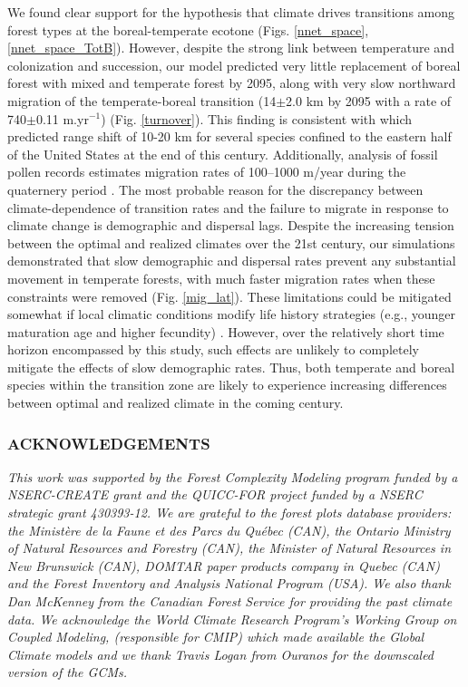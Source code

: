 We found clear support for the hypothesis that climate drives transitions among forest types at the
boreal-temperate ecotone (Figs. \ref{nnet_space}, \ref{nnet_space_TotB}).  However, despite the
strong link between temperature and colonization and succession, our model predicted very little
replacement of boreal forest with mixed and temperate forest by 2095, along with very slow northward
migration of the temperate-boreal transition (14$\pm$2.0 km by 2095 with a rate of 740$\pm$0.11
m.yr$^{-1}$) (Fig. \ref{turnover}). This finding is consistent with \citet{Iverson2004} which
predicted range shift of 10-20 km for several species confined to the eastern half of the United
States at the end of this century.  Additionally, analysis of fossil pollen records estimates
migration rates of 100--1000 m/year during the quaternery period
\citep{Davis1981,MacDonald1986,McLachlan2005}. The most probable reason for the discrepancy between
climate-dependence of transition rates and the failure to migrate in response to climate change is
demographic and dispersal lags. Despite the increasing tension between the optimal and realized
climates over the 21st century, our simulations demonstrated that slow demographic and dispersal
rates prevent any substantial movement in temperate forests, with much faster migration rates when
these constraints were removed (Fig. \ref{mig_lat}). These limitations could be mitigated somewhat
if local climatic conditions modify life history strategies (e.g., younger maturation age and higher
fecundity) \citep{Snell2014a}.  However, over the relatively short time horizon encompassed by this
study, such effects are unlikely to completely mitigate the effects of slow demographic rates. Thus,
both temperate and boreal species within the transition zone are likely to experience increasing
differences between optimal and realized climate in the coming century.

\subsubsection*{\uppercase{Acknowledgements}}
\textit{This work was supported by the Forest Complexity Modeling program
funded by a NSERC-CREATE grant and the QUICC-FOR project funded by a NSERC
strategic grant 430393-12. We are grateful to the forest plots database providers: the
Ministère de la Faune et des Parcs du Québec (CAN), the Ontario Ministry of
Natural Resources and Forestry (CAN), the Minister of Natural Resources in New
Brunswick (CAN), DOMTAR paper products company in Quebec (CAN) and the Forest
Inventory and Analysis National Program (USA). We also thank Dan McKenney from
the Canadian Forest Service for providing the past climate data.  We
acknowledge the World Climate Research Program's Working Group on Coupled
Modeling, (responsible for CMIP) which made available the Global Climate
models and we thank Travis Logan from Ouranos for the downscaled version of
the GCMs.}

